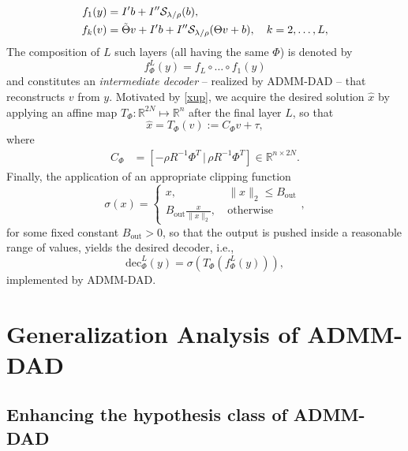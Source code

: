 \documentclass[preprint,12pt]{elsarticle}
\newcommand{\st}{\mathcal{S}}\newcommand{\sgn}{\mathrm{sign}}
\begin{document}
\begin{align}
    \label{layer1}
    f_1(y) & =I'b+I''\st_{\lambda/\rho}(b),\\
    \label{layerk}
    f_k(v) & =\Tilde{\Theta}v+I'b+I''\st_{\lambda/\rho}(\Theta v+b), \quad k = 2, \hdots, L,
\end{align}
The composition of $L$ such layers (all having the same $\Phi$) is denoted by
\begin{equation}\label{interdec}
    f^L_{\Phi}(y)=f_{L}\circ\dots\circ f_1(y)
\end{equation}
and constitutes an \textit{intermediate decoder} -- realized by ADMM-DAD -- that reconstructs $v$ from $y$. Motivated by \eqref{xup}, we acquire the desired solution $\hat{x}$ by applying an affine map $T_\Phi:\mathbb{R}^{2N}\mapsto\mathbb{R}^{n}$ after the final layer $L$, so that
\begin{equation}\label{tauf}
    \hat{x}=T_\Phi(v):=C_\Phi v+\tau,
\end{equation}
where
\begin{align}
\label{coft}
    C_\Phi&=[-\rho R^{-1}\Phi^T\,\vert\,\rho R^{-1}\Phi^T]\in\mathbb{R}^{n\times2N}.
\end{align}
Finally, the application of an appropriate clipping function
\begin{equation}\label{psi}
    \sigma(x) = \left\{\begin{array}{cc}
    x,&\ \|x\|_2 \leq B_{\mathrm{out}}\\
    B_{\mathrm{out}}\frac{x}{\|x\|_2},&\ \text{otherwise}
    \end{array}\right.,
\end{equation} 
for some fixed constant $B_{\mathrm{out}}>0$, so that the output is pushed inside a reasonable range of values, yields the desired decoder, i.e.,
\begin{equation}\label{decoder}
    \mathrm{dec}_\Phi^L(y)=\sigma(T_\Phi(f_\Phi^L(y))),
\end{equation}
implemented by ADMM-DAD.

\section{Generalization Analysis of ADMM-DAD}
\label{mainsec}
\subsection{Enhancing the hypothesis class of ADMM-DAD}\label{hypoth}
\end{document}
